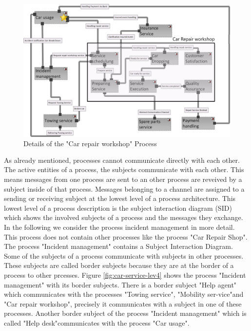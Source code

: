 \begin{figure}[htbp]
	\centering
	\includegraphics[width=0.8\linewidth]{Figures/Chapter5/figures-hierarchy/Car-Service-Lev3}
	\caption[Details of the "Car repair workshop" Process]{Details of the "Car repair workshop" Process}
	\label{fig:car-service-lev3}
\end{figure}

As already mentioned, processes cannot communicate directly with each other. The active entities of a process, the subjects communicate with each other. This means messages from one process are sent to an other process are reveived by a subject inside of that process. Messages belonging to a channel are assigned to a sending or receiving subject at the lowest level of a process architecture. This lowest level of a process description is the subject interaction diagram (SID) which shows the involved subjects of a process and the messages they exchange. In the following we consider the process incident management in more detail. This process does not contain other processes like the process "Car Repair Shop". The process "Incident management" contains a Subject Interaction Diagram. Some of the subjects of a process communicate with subjects in other processes. These subjects are called border subjects because they are at the border of a process to other prcesses. Figure \ref{fig:car-service-lev4} shows the process "Incident management" with its border subjects. There is a border subject "Help agent" which communicates with the processes "Towing service", "Mobility ser-vice"and  "Car repair workshop", precisely it communicates with a subject in one of these processes. Another border subject of the process "Incident management" which is called "Help desk"communicates with the process "Car usage".\\

